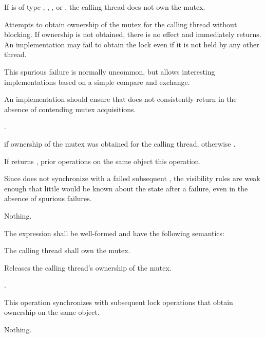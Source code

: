 \begin{itemdescr}
\pnum
\requires If  is of type , ,
, or , the calling
thread does not own the mutex.

\pnum
\effects
Attempts to obtain ownership of the mutex for the calling thread without
blocking. If ownership is not obtained, there is no effect and 
immediately returns. An implementation may fail to obtain the lock even if it is not
held by any other thread.
\begin{note}
This spurious failure is normally uncommon, but
allows interesting implementations based on a simple
compare and exchange.
\end{note}
An implementation should ensure that  does not consistently return 
in the absence of contending mutex acquisitions.

\pnum
\returntype {}.

\pnum
\returns
{} if ownership of the mutex was obtained for the calling
thread, otherwise .

\pnum
\sync
If  returns , prior  operations
on the same object  this operation.
\begin{note}
Since  does not synchronize with a failed subsequent
, the visibility rules are weak enough that little would be
known about the state after a failure, even in the absence of spurious failures.
\end{note}

\pnum
\throws
Nothing.
\end{itemdescr}

\pnum
The expression  shall be well-formed and have the following semantics:

\begin{itemdescr}
\pnum
\requires The calling thread shall own the mutex.

\pnum
\effects
Releases the calling thread's ownership of the mutex.

\pnum
\returntype {}.

\pnum
\sync
This operation synchronizes with subsequent
lock operations that obtain ownership on the same object.

\pnum
\throws
Nothing.
\end{itemdescr}

